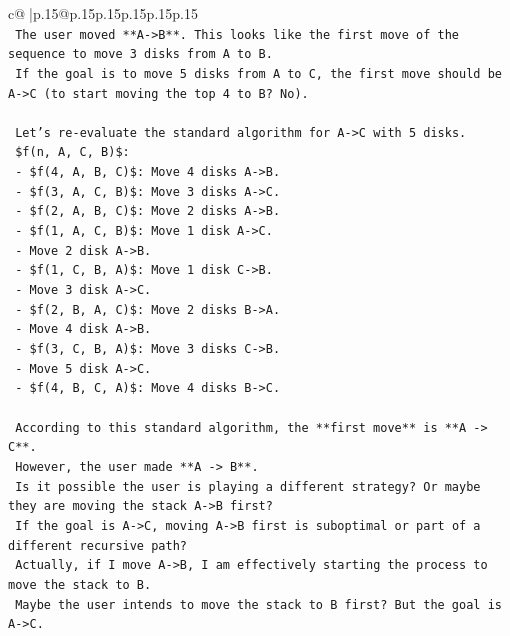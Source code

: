 \documentclass{article}
\begin{document}
{\begin{supertabular}{c@{$\;$}|p{.15\linewidth}@{}p{.15\linewidth}p{.15\linewidth}p{.15\linewidth}p{.15\linewidth}p{.15\linewidth}}
{{{\\ 
\texttt{    The user moved **A{-}>B**. This looks like the first move of the sequence to move 3 disks from A to B.} \\
\texttt{    If the goal is to move 5 disks from A to C, the first move should be A{-}>C (to start moving the top 4 to B? No).} \\
\\ 
\texttt{    Let's re{-}evaluate the standard algorithm for A{-}>C with 5 disks.} \\
\texttt{    \$f(n, A, C, B)\$:} \\
\texttt{    {-} \$f(4, A, B, C)\$: Move 4 disks A{-}>B.} \\
\texttt{      {-} \$f(3, A, C, B)\$: Move 3 disks A{-}>C.} \\
\texttt{        {-} \$f(2, A, B, C)\$: Move 2 disks A{-}>B.} \\
\texttt{          {-} \$f(1, A, C, B)\$: Move 1 disk A{-}>C.} \\
\texttt{          {-} Move 2 disk A{-}>B.} \\
\texttt{          {-} \$f(1, C, B, A)\$: Move 1 disk C{-}>B.} \\
\texttt{        {-} Move 3 disk A{-}>C.} \\
\texttt{        {-} \$f(2, B, A, C)\$: Move 2 disks B{-}>A.} \\
\texttt{      {-} Move 4 disk A{-}>B.} \\
\texttt{      {-} \$f(3, C, B, A)\$: Move 3 disks C{-}>B.} \\
\texttt{    {-} Move 5 disk A{-}>C.} \\
\texttt{    {-} \$f(4, B, C, A)\$: Move 4 disks B{-}>C.} \\
\\ 
\texttt{    According to this standard algorithm, the **first move** is **A {-}> C**.} \\
\texttt{    However, the user made **A {-}> B**.} \\
\texttt{    Is it possible the user is playing a different strategy? Or maybe they are moving the stack A{-}>B first?} \\
\texttt{    If the goal is A{-}>C, moving A{-}>B first is suboptimal or part of a different recursive path?} \\
\texttt{    Actually, if I move A{-}>B, I am effectively starting the process to move the stack to B.} \\
\texttt{    Maybe the user intends to move the stack to B first? But the goal is A{-}>C.} \\
}}}
\end{supertabular}}
\end{document}
